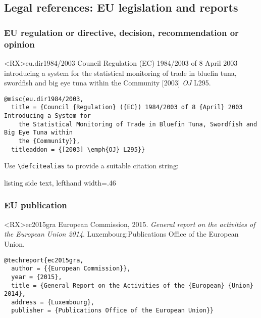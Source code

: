 \documentclass[10pt,a4paper]{article}
\newenvironment{hacks}{%
  \begin{list}{\makebox[2em][c]{\faWrench}}{%
    \setlength{\leftmargin}{2em}
    \setlength{\labelwidth}{2em}
    \setlength{\labelsep}{0pt}}
}{\end{list}}
\begin{document}
\subsection{Legal references: EU legislation and reports}


\subsubsection*{EU regulation or directive, decision, recommendation or opinion}

\begin{bibexbox}<RX>{eu.dir1984/2003}
  Council Regulation (EC) 1984/2003 of 8 April 2003 introducing a system for the statistical monitoring of trade in bluefin tuna, swordfish and big eye tuna within the Community [2003] \emph{OJ} L295.
  \tcblower
\begin{Verbatim}
@misc{eu.dir1984/2003,
  title = {Council {Regulation} ({EC}) 1984/2003 of 8 {April} 2003 Introducing a System for
    the Statistical Monitoring of Trade in Bluefin Tuna, Swordfish and Big Eye Tuna within
    the {Community}},
  titleaddon = {[2003] \emph{OJ} L295}}
\end{Verbatim}
\end{bibexbox}

\begin{hacks}
\item Use \lstinline[style=dtxlatex]|\defcitealias| to provide a suitable citation string:
\begin{tcblisting}{listing side text, lefthand width=.46\linewidth}
\end{tcblisting}
\end{hacks}


\subsubsection*{EU publication}

\begin{bibexbox}<RX>{ec2015gra}
  European Commission, 2015. \emph{General report on the activities of the European Union 2014}. Luxembourg:\@ Publications Office of the European Union.
  \tcblower
\begin{Verbatim}
@techreport{ec2015gra,
  author = {{European Commission}},
  year = {2015},
  title = {General Report on the Activities of the {European} {Union} 2014},
  address = {Luxembourg},
  publisher = {Publications Office of the European Union}}
\end{Verbatim}
\end{bibexbox}
\end{document}
